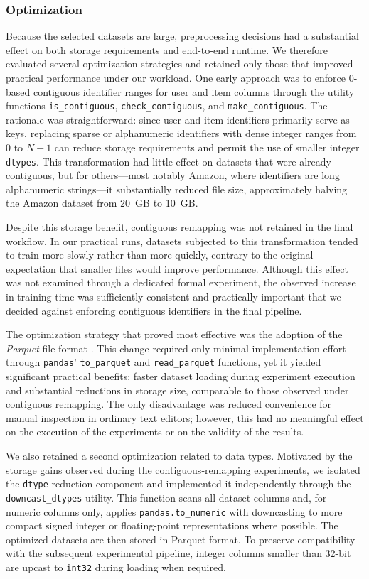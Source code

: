 \documentclass[12pt,a4paper]{article}
\begin{document}
\subsubsection{Optimization}
Because the selected datasets are large, preprocessing decisions had a substantial effect on both storage requirements and end-to-end runtime. We therefore evaluated several optimization strategies and retained only those that improved practical performance under our workload. One early approach was to enforce 0-based contiguous identifier ranges for user and item columns through the utility functions \texttt{is\_contiguous}, \texttt{check\_contiguous}, and \texttt{make\_contiguous}. The rationale was straightforward: since user and item identifiers primarily serve as keys, replacing sparse or alphanumeric identifiers with dense integer ranges from $0$ to $N-1$ can reduce storage requirements and permit the use of smaller integer \texttt{dtypes}. This transformation had little effect on datasets that were already contiguous, but for others---most notably Amazon, where identifiers are long alphanumeric strings---it substantially reduced file size, approximately halving the Amazon dataset from 20~GB to 10~GB.

Despite this storage benefit, contiguous remapping was not retained in the final workflow. In our practical runs, datasets subjected to this transformation tended to train more slowly rather than more quickly, contrary to the original expectation that smaller files would improve performance. Although this effect was not examined through a dedicated formal experiment, the observed increase in training time was sufficiently consistent and practically important that we decided against enforcing contiguous identifiers in the final pipeline.

The optimization strategy that proved most effective was the adoption of the \emph{Parquet} file format \cite{parquet}. This change required only minimal implementation effort through \texttt{pandas}' \texttt{to\_parquet} and \texttt{read\_parquet} functions, yet it yielded significant practical benefits: faster dataset loading during experiment execution and substantial reductions in storage size, comparable to those observed under contiguous remapping. The only disadvantage was reduced convenience for manual inspection in ordinary text editors; however, this had no meaningful effect on the execution of the experiments or on the validity of the results.

We also retained a second optimization related to data types. Motivated by the storage gains observed during the contiguous-remapping experiments, we isolated the \texttt{dtype} reduction component and implemented it independently through the \texttt{downcast\_dtypes} utility. This function scans all dataset columns and, for numeric columns only, applies \texttt{pandas.to\_numeric} with downcasting to more compact signed integer or floating-point representations where possible. The optimized datasets are then stored in Parquet format. To preserve compatibility with the subsequent experimental pipeline, integer columns smaller than 32-bit are upcast to \texttt{int32} during loading when required.
\end{document}
